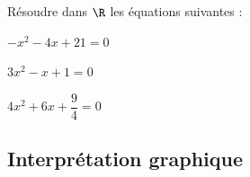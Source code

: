 \documentclass[11 pt, a4paper]{article}
\begin{document}
\bigskip


\begin{Ex}\label{ex1}
Résoudre dans $\R$ les équations suivantes : %
\vspace{-0.4cm}
\begin{tabenum} %
\item $-x^2-4x+21=0$\qquad \qquad \qquad
\item $3x^2 -x+1=0$\qquad \qquad \qquad
\item $4x^2+6x+\dfrac{9}{4}=0$
\end{tabenum}
\end{Ex}

\vspace{5cm}



\newpage



	\subsection{Interprétation graphique}
	
\vspace{-0.7cm}
\end{document}
